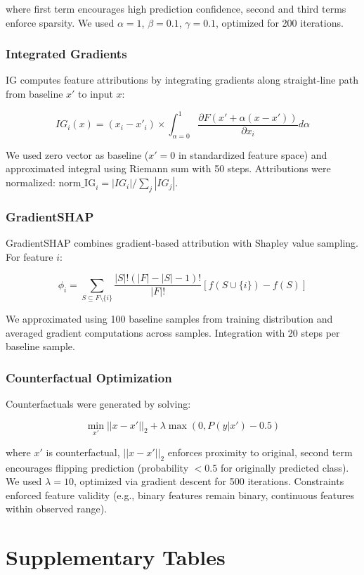 \documentclass[11pt]{article}
\begin{document}
where first term encourages high prediction confidence, second and third terms enforce sparsity. We used $\alpha=1$, $\beta=0.1$, $\gamma=0.1$, optimized for 200 iterations.

\subsubsection{Integrated Gradients}
IG computes feature attributions by integrating gradients along straight-line path from baseline $x'$ to input $x$:

$$IG_i(x) = (x_i - x'_i) \times \int_{\alpha=0}^1 \frac{\partial F(x' + \alpha(x - x'))}{\partial x_i} d\alpha$$

We used zero vector as baseline ($x' = 0$ in standardized feature space) and approximated integral using Riemann sum with 50 steps. Attributions were normalized: $\text{norm\_IG}_i = |IG_i| / \sum_j |IG_j|$.

\subsubsection{GradientSHAP}
GradientSHAP combines gradient-based attribution with Shapley value sampling. For feature $i$:

$$\phi_i = \sum_{S \subseteq F \setminus \{i\}} \frac{|S|!(|F|-|S|-1)!}{|F|!} [f(S \cup \{i\}) - f(S)]$$

We approximated using 100 baseline samples from training distribution and averaged gradient computations across samples. Integration with 20 steps per baseline sample.

\subsubsection{Counterfactual Optimization}
Counterfactuals were generated by solving:

$$\min_{x'} ||x - x'||_2 + \lambda \max(0, P(y|x') - 0.5)$$

where $x'$ is counterfactual, $||x - x'||_2$ enforces proximity to original, second term encourages flipping prediction (probability $<0.5$ for originally predicted class). We used $\lambda = 10$, optimized via gradient descent for 500 iterations. Constraints enforced feature validity (e.g., binary features remain binary, continuous features within observed range).

\section{Supplementary Tables}
\end{document}

